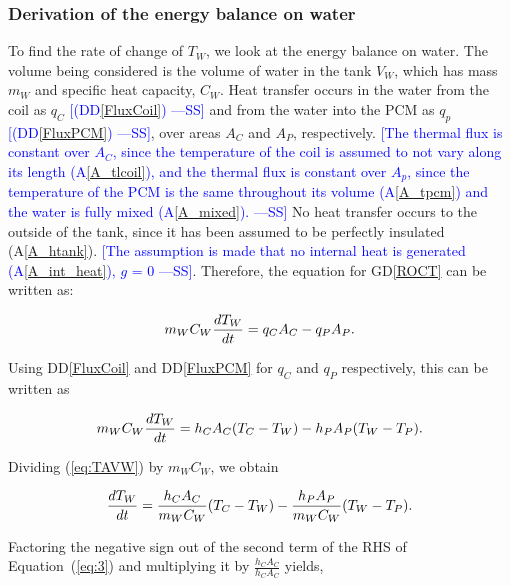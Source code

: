 \documentclass[12pt]{article}
\newcommand{\authornote}[3]{\textcolor{#1}{[#3 ---#2]}}
\newcommand{\authornote}[3]{}
\newcommand{\wss}[1]{\authornote{blue}{SS}{#1}}
\newcommand{\dref}[1]{GD\ref{#1}}
\newcommand{\ddref}[1]{DD\ref{#1}}
\newcommand{\aref}[1]{A\ref{#1}}
\begin{document}

\subsubsection*{Derivation of the energy balance on water}

To find the rate of change of $T_W$, we look at the energy balance on water.
The volume being considered is the volume of water in the tank $V_W$, which has
mass $m_W$ and specific heat capacity, $C_W$.  Heat transfer occurs in the water
from the coil as $q_C$ \wss{(\ddref{FluxCoil})} and from the water into the PCM as
$q_p$ \wss{(\ddref{FluxPCM})}, over areas $A_C$ and $A_P$, respectively.  \wss{The
  thermal flux is constant over $A_C$, since the temperature of the coil is
  assumed to not vary along its length (\aref{A_tlcoil}), and the thermal flux is constant over
  $A_p$, since the temperature of the PCM is the same throughout its
  volume (\aref{A_tpcm}) and the water is fully mixed (\aref{A_mixed}).}  No heat
transfer occurs to the outside of the tank, since it has been assumed to be
perfectly insulated (\aref{A_htank}).  \wss{The assumption is made that no
  internal heat is generated (\aref{A_int_heat}), $g$ = 0}.  Therefore, the
equation for \dref{ROCT} can be written as:

\begin{equation*}
\\m_W C_W \frac{dT_W}{dt} = q_C A_C - q_P A_P.
\end{equation*}

\noindent
Using \ddref{FluxCoil} and \ddref{FluxPCM} for $q_C$ and $q_P$ respectively,
this can be written as

\begin{equation}
\\m_W C_W \frac{dT_W}{dt} = h_C A_C (T_C - T_W) - h_P A_P (T_W - T_P). \label{eq:TAVW}
\end{equation}

\noindent
Dividing (\ref{eq:TAVW}) by $m_W C_W$, we obtain

\begin{equation}
\\ \frac{dT_W}{dt} = \frac{h_C A_C}{m_W C_W} (T_C - T_W) - 
\frac{h_P A_P}{m_WC_W} (T_W - T_P).\label{eq:3}
\end{equation}

\noindent

Factoring the negative sign out of the second term of the RHS of
Equation~(\ref{eq:3}) and multiplying it by $\frac{h_C A_C}{h_C A_C}$ yields,
\end{document}
